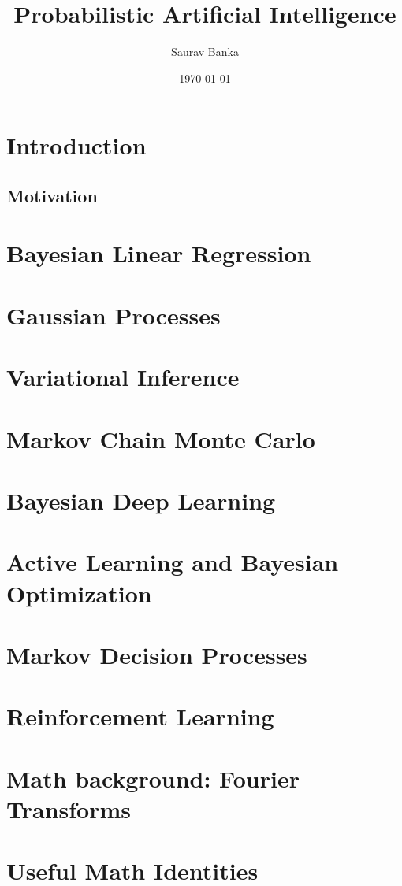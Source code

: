 \documentclass[11pt]{article}
\title{Probabilistic Artificial Intelligence}
\author{Saurav Banka}
\date{\today}
\begin{document}
\maketitle

\section{Introduction}
\subsection{Motivation}
\newpage

\section{Bayesian Linear Regression}
\newpage

\section{Gaussian Processes}
\newpage


\section{Variational Inference}
\newpage

\section{Markov Chain Monte Carlo}
\newpage

\section{Bayesian Deep Learning}
\newpage

\section{Active Learning and Bayesian Optimization}
\newpage

\section{Markov Decision Processes}
\newpage

\section{Reinforcement Learning}
\newpage

\appendix
\section{Math background: Fourier Transforms}
\newpage
\section{Useful Math Identities}
\end{document}
